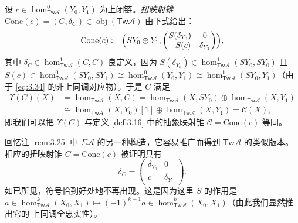 \begin{Def}\label{def:3.34}
设 $c\in\hom^0_{\mathsf{Tw}\mathcal A}(Y_0,Y_1)$ 为上闭链。\emph{扭映射锥}
$\mathrm{Cone}(c)=(C,\delta_C)\in\operatorname{obj}(\mathsf{Tw}\mathcal A)$
由下式给出：
\begin{equation}\label{eq:3.48}
  \mathrm{Cone}(c):=\Bigl(SY_0\oplus Y_1,
  \begin{pmatrix}
    S(\delta_{Y_0}) & 0\\
    -S(c) & \delta_{Y_1}
  \end{pmatrix}\Bigr),
\end{equation}
其中 $\delta_C\in\hom^1_{\mathsf{Tw}\mathcal A}(C,C)$ 良定义，因为
$S(\delta_{Y_0})\in\hom^1_{\mathsf{Tw}\mathcal A}(SY_0,SY_0)$ 且
$S(c)\in\hom^0_{\mathsf{Tw}\mathcal A}(SY_0,SY_1)\cong
\hom^0_{\mathsf{Tw}\mathcal A}(Y_0,Y_1)\cong\hom^1_{\mathsf{Tw}\mathcal A}
(SY_0,Y_1)$（由于 \eqref{eq:3.34} 的非上同调对应物）。于是 $C$ 满足
\begin{equation}\label{eq:3.49}
  \begin{aligned}
    \Upsilon(C)(X)&=\hom_{\mathsf{Tw}\mathcal A}(X,C)=
    \hom_{\mathsf{Tw}\mathcal A}(X,SY_0)\oplus\hom_{\mathsf{Tw}\mathcal A}
    (X,Y_1)\\
    &\cong\hom_{\mathsf{Tw}\mathcal A}(X,Y_0)[1]\oplus
    \hom_{\mathsf{Tw}\mathcal A}(X,Y_1)=\mathcal C(X),
  \end{aligned}
\end{equation}
即我们可以把 $\Upsilon(C)$ 与定义 \ref{def:3.16} 中的抽象映射锥
$\mathcal C=\mathrm{Cone}(c)$ 等同。
\end{Def}

\begin{Rem}\label{rem:3.35}
回忆注 \ref{rem:3.25} 中 $\Sigma\mathcal A$ 的另一种构造，它容易推广而得到
$\mathsf{Tw}\mathcal A$ 的类似版本。相应的扭映射锥
$C=\mathrm{Cone}(c)$ 被证明具有
\[
  \delta_C=
  \begin{pmatrix}
    \delta_{Y_0} & 0\\
    c & \delta_{Y_1}
  \end{pmatrix}.
\]
如已所见，符号恰到好处地不再出现。这是因为这里 $S$ 的作用是
$a\in\hom^k_{\mathsf{Tw}\mathcal A}(X_0,X_1)\mapsto
(-1)^{k-1}a\in\hom^k_{\mathsf{Tw}\mathcal A}(X_0,X_1)$（由此我们显然推出它的
上同调全忠实性）。
\end{Rem}

